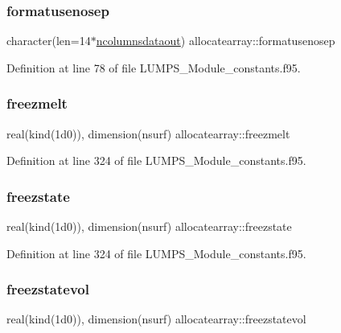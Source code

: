 \subsubsection{\texorpdfstring{formatusenosep}{formatusenosep}}
{\footnotesize\ttfamily character(len=14$\ast$\hyperlink{namespaceallocatearray_a9408900bed6c87ed095d2c688c1506a0}{ncolumnsdataout}) allocatearray\+::formatusenosep}



Definition at line 78 of file L\+U\+M\+P\+S\+\_\+\+Module\+\_\+constants.\+f95.

\mbox{\label{namespaceallocatearray_a165ac402a66632f6391621809d9f4e06}} 
\subsubsection{\texorpdfstring{freezmelt}{freezmelt}}
{\footnotesize\ttfamily real(kind(1d0)), dimension(nsurf) allocatearray\+::freezmelt}



Definition at line 324 of file L\+U\+M\+P\+S\+\_\+\+Module\+\_\+constants.\+f95.

\mbox{\label{namespaceallocatearray_af5b993a8153934d57f5a466152bdd625}} 
\subsubsection{\texorpdfstring{freezstate}{freezstate}}
{\footnotesize\ttfamily real(kind(1d0)), dimension(nsurf) allocatearray\+::freezstate}



Definition at line 324 of file L\+U\+M\+P\+S\+\_\+\+Module\+\_\+constants.\+f95.

\mbox{\label{namespaceallocatearray_aaace92afa1f3dd88d1517345cbc9faba}} 
\subsubsection{\texorpdfstring{freezstatevol}{freezstatevol}}
{\footnotesize\ttfamily real(kind(1d0)), dimension(nsurf) allocatearray\+::freezstatevol}



